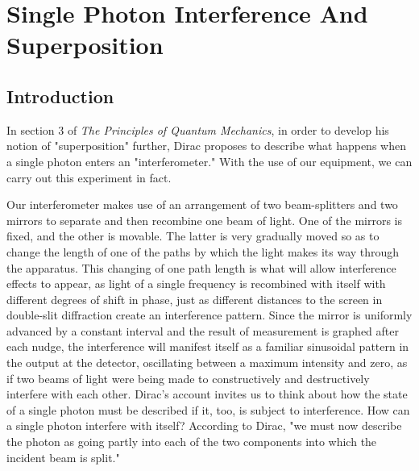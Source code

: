 \chapter{Single Photon Interference And Superposition}



\section*{Introduction}

In section 3 of \emph{The Principles of Quantum Mechanics}, in order to develop his notion of "superposition" further, Dirac proposes to describe what happens when a single photon enters an "interferometer." With the use of our equipment, we can carry out this experiment in fact.

Our interferometer makes use of an arrangement of two beam-splitters and two mirrors to separate and then recombine one beam of light. One of the mirrors is fixed, and the other is movable. The latter is very gradually moved so as to change the length of one of the paths by which the light makes its way through the apparatus. This changing of one path length is what will allow interference effects to appear, as light of a single frequency is recombined with itself with different degrees of shift in phase, just as different distances to the screen in double-slit diffraction create an interference pattern. Since the mirror is uniformly advanced by a constant interval and the result of measurement is graphed after each nudge, the interference will manifest itself as a familiar sinusoidal pattern in the output at the detector, oscillating between a maximum intensity and zero, as if two beams of light were being made to constructively and destructively interfere with each other. Dirac's account invites us to think about how the state of a single photon must be described if it, too, is subject to interference. How can a single photon interfere with itself? According to Dirac, "we must now describe the photon as going partly into each of the two components into which the incident beam is split."



